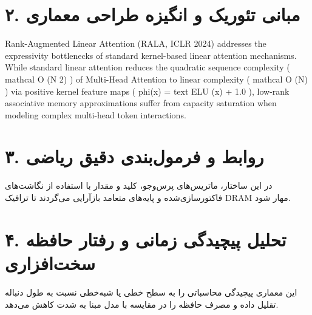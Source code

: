 \documentclass[12pt,a4paper]{article}
\begin{document}
\section*{۲. مبانی تئوریک و انگیزه طراحی معماری}
Rank-Augmented Linear Attention (RALA, ICLR 2024) addresses the expressivity bottlenecks of standard kernel-based linear attention mechanisms. While standard linear attention reduces the quadratic sequence complexity ( mathcal O (N 2) ) of Multi-Head Attention to linear complexity ( mathcal O (N) ) via positive kernel feature maps ( phi(x) = text ELU (x) + 1.0 ), low-rank associative memory approximations suffer from capacity saturation when modeling complex multi-head token interactions.

\section*{۳. روابط و فرمول‌بندی دقیق ریاضی}
در این ساختار، ماتریس‌های پرس‌وجو، کلید و مقدار با استفاده از نگاشت‌های فاکتورسازی‌شده و پایه‌های متعامد بازآرایی می‌گردند تا ترافیک DRAM مهار شود.

\section*{۴. تحلیل پیچیدگی زمانی و رفتار حافظه سخت‌افزاری}
این معماری پیچیدگی محاسباتی را به سطح خطی یا شبه‌خطی نسبت به طول دنباله تقلیل داده و مصرف حافظه را در مقایسه با مدل مبنا به شدت کاهش می‌دهد.
\end{document}
